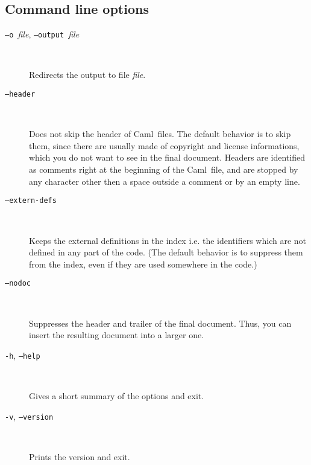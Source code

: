 \documentclass[12pt]{article}
\newcommand{\Caml}{\textsf{Caml}}
\begin{document}
\subsection*{Command line options}

\begin{description}

\item[\texttt{--o }\textit{file}, \texttt{--output }\textit{file}] ~\par
  
  Redirects the output to file \textit{file}.

\item[\texttt{--header}] ~\par

  Does not skip the header of \Caml\ files. The default behavior is to
  skip them, since there are usually made of copyright and license
  informations, which you do not want to see in the final document.
  Headers are identified as comments right at the beginning of the
  \Caml\ file, and are stopped by any character other then a space
  outside a comment or by an empty line. 

\item[\texttt{--extern-defs}] ~\par

  Keeps the external definitions in the index i.e. the identifiers
  which are not defined in any part of the code. (The default behavior
  is to suppress them from the index, even if they are used somewhere
  in the code.)

\item[\texttt{--nodoc}] ~\par

  Suppresses the header and trailer of the final document. Thus, you can
  insert the resulting document into a larger one.

\item[\texttt{-h}, \texttt{--help}] ~\par

  Gives a short summary of the options and exit.

\item[\texttt{-v}, \texttt{--version}] ~\par

  Prints the version and exit.

\end{description}

\end{document}
